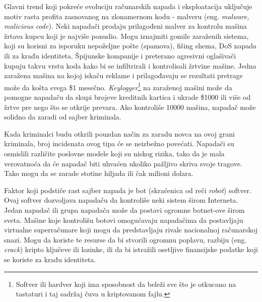 \documentclass[a4paper]{article}
\theoremstyle{break}
\begin{document}
{Glavni trend koji pokreće evoluciju računarskih napada i eksploatacija uključuje motiv rasta profita zasnovanog na zlonamernom kodu - malveru (eng. {\em malware, malicious code}). Neki napadači prodaju prilagođeni malver za kontrolu mašina žrtava kupcu koji je najviše ponudio. Mogu iznajmiti gomile zaraženih sistema, koji su korisni za isporuku nepoželjne pošte (spamova), fišing shema, DoS napada ili za krađu identiteta. Špijunske kompanije i preterano agresivni oglašivači kupuju takvu vrstu koda kako bi se infiltrirali i kontrolisali žrtvine mašine. Jedna zaražena mašina na kojoj iskaču reklame i prilagođavaju se rezultati pretrage može da košta svega \$1 mesečno. {\em Keylogger}\footnote{Softver ili hardver koji ima sposobnost da beleži sve što je otkucano na tastaturi i taj sadržaj čuva u kriptovanom fajlu.} na zaraženoj mašini može da pomogne napadaču da skupi brojeve kreditnih kartica i ukrade \$1000 ili više od žrtve pre nego što se otkrije prevara. Ako kontroliše 10000 mašina, napadač može solidno da zaradi od sajber kriminala. 

Kada kriminalci budu otkrili pouzdan način za zaradu novca na ovoj grani kriminala, broj incidenata ovog tipa će se neizbežno povećati. Napadači su osmislili različite poslovne modele koji su niskog rizika, tako da je mala verovatnoća da će napadač biti uhvaćen ukoliko pažljivo skriva svoje tragove. Tako mogu da se zarade stotine hiljada ili čak milioni dolara.

Faktor koji podstiče rast sajber napada je bot (skraćenica od reči \textit{robot}) softver. Ovaj softver dozvoljava napadaču da kontroliše neki sistem širom Interneta. Jedan napadač ili grupa napadača može da postavi ogromne botnet-ove širom sveta. Mašine koje kontrolišu botovi omogućavaju napadačima da postavljaju virtualne superračunare koji mogu da predstavljaju rivale nacionalnoj računarskoj snazi. Mogu da koriste te resurse da bi stvorili ogromnu poplavu, razbiju (eng. {\em crack}) kripto ključeve ili lozinke, ili da bi istražili osetljive finansijske podatke koji se koriste za krađu identiteta.

}
\end{document}
